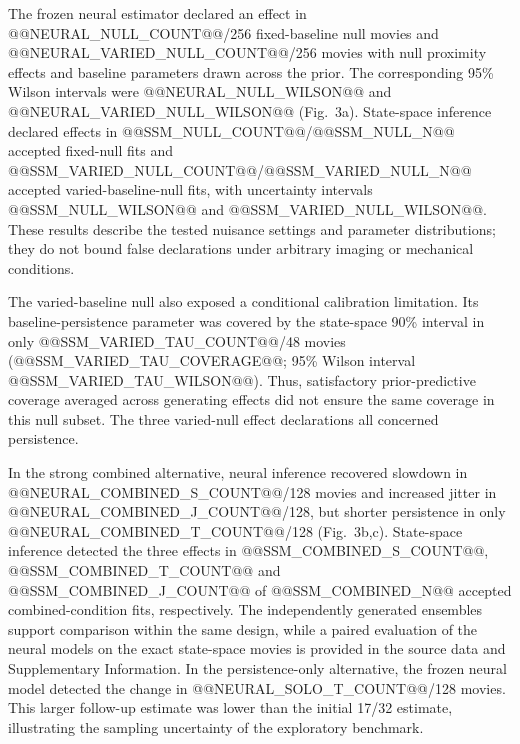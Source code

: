 \documentclass[12pt]{article}
\begin{document}
The frozen neural estimator declared an effect in @@NEURAL_NULL_COUNT@@/256 fixed-baseline null movies and @@NEURAL_VARIED_NULL_COUNT@@/256 movies with null proximity effects and baseline parameters drawn across the prior. The corresponding 95\% Wilson intervals were @@NEURAL_NULL_WILSON@@ and @@NEURAL_VARIED_NULL_WILSON@@ (Fig.~3a). State-space inference declared effects in @@SSM_NULL_COUNT@@/@@SSM_NULL_N@@ accepted fixed-null fits and @@SSM_VARIED_NULL_COUNT@@/@@SSM_VARIED_NULL_N@@ accepted varied-baseline-null fits, with uncertainty intervals @@SSM_NULL_WILSON@@ and @@SSM_VARIED_NULL_WILSON@@. These results describe the tested nuisance settings and parameter distributions; they do not bound false declarations under arbitrary imaging or mechanical conditions.

The varied-baseline null also exposed a conditional calibration limitation. Its baseline-persistence parameter was covered by the state-space 90\% interval in only @@SSM_VARIED_TAU_COUNT@@/48 movies (@@SSM_VARIED_TAU_COVERAGE@@; 95\% Wilson interval @@SSM_VARIED_TAU_WILSON@@). Thus, satisfactory prior-predictive coverage averaged across generating effects did not ensure the same coverage in this null subset. The three varied-null effect declarations all concerned persistence.

In the strong combined alternative, neural inference recovered slowdown in @@NEURAL_COMBINED_S_COUNT@@/128 movies and increased jitter in @@NEURAL_COMBINED_J_COUNT@@/128, but shorter persistence in only @@NEURAL_COMBINED_T_COUNT@@/128 (Fig.~3b,c). State-space inference detected the three effects in @@SSM_COMBINED_S_COUNT@@, @@SSM_COMBINED_T_COUNT@@ and @@SSM_COMBINED_J_COUNT@@ of @@SSM_COMBINED_N@@ accepted combined-condition fits, respectively. The independently generated ensembles support comparison within the same design, while a paired evaluation of the neural models on the exact state-space movies is provided in the source data and Supplementary Information. In the persistence-only alternative, the frozen neural model detected the change in @@NEURAL_SOLO_T_COUNT@@/128 movies. This larger follow-up estimate was lower than the initial 17/32 estimate, illustrating the sampling uncertainty of the exploratory benchmark.
\end{document}
